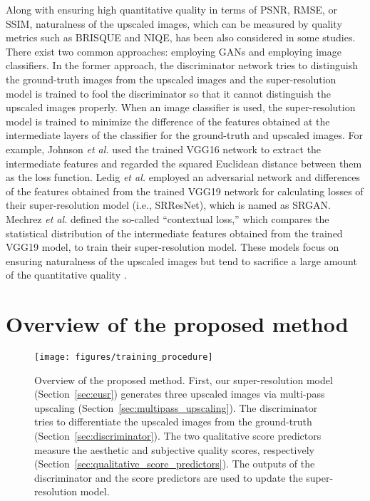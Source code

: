 \documentclass[runningheads]{llncs}
\begin{document}
Along with ensuring high quantitative quality in terms of PSNR, RMSE, or SSIM, naturalness of the upscaled images, which can be measured by quality metrics such as BRISQUE and NIQE, has been also considered in some studies.
There exist two common approaches: employing GANs \cite{goodfellow2014generative} and employing image classifiers.
In the former approach, the discriminator network tries to distinguish the ground-truth images from the upscaled images and the super-resolution model is trained to fool the discriminator so that it cannot distinguish the upscaled images properly.
When an image classifier is used, the super-resolution model is trained to minimize the difference of the features obtained at the intermediate layers of the classifier for the ground-truth and upscaled images.
For example, Johnson \textit{et al.} \cite{johnson2016perceptual} used the trained VGG16 network to extract the intermediate features and regarded the squared Euclidean distance between them as the loss function.
Ledig \textit{et al.} \cite{ledig2017photo} employed an adversarial network and differences of the features obtained from the trained VGG19 network for calculating losses of their super-resolution model (i.e., SRResNet), which is named as SRGAN.
Mechrez \textit{et al.} \cite{mechrez2018learning} defined the so-called ``contextual loss,'' which compares the statistical distribution of the intermediate features obtained from the trained VGG19 model, to train their super-resolution model.
These models focus on ensuring naturalness of the upscaled images but tend to sacrifice a large amount of the quantitative quality \cite{blau2017perception}.



\section{Overview of the proposed method}
\label{sec:method}

\begin{figure}[t]
	\centering
	\texttt{[image: figures/training\_procedure]}
	\caption{Overview of the proposed method. First, our super-resolution model (Section~\ref{sec:eusr}) generates three upscaled images via multi-pass upscaling (Section~\ref{sec:multipass_upscaling}). The discriminator tries to differentiate the upscaled images from the ground-truth (Section~\ref{sec:discriminator}). The two qualitative score predictors measure the aesthetic and subjective quality scores, respectively (Section~\ref{sec:qualitative_score_predictors}). The outputs of the discriminator and the score predictors are used to update the super-resolution model.}
	\label{fig:method_procedure}
\end{figure}
\end{document}
